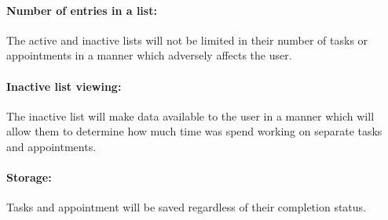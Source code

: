 \documentclass[12pt,a4paper]{article}
\begin{document}
\paragraph{Number of entries in a list:} The active and inactive lists will not be limited in their number of tasks or appointments in a manner which adversely affects the user. 
\paragraph{Inactive list viewing:} The inactive list will make data available to the user in a manner which will allow them to determine how much time was spend working on separate tasks and appointments.
\paragraph{Storage:} Tasks and appointment will be saved regardless of their completion status.

\end{document}
